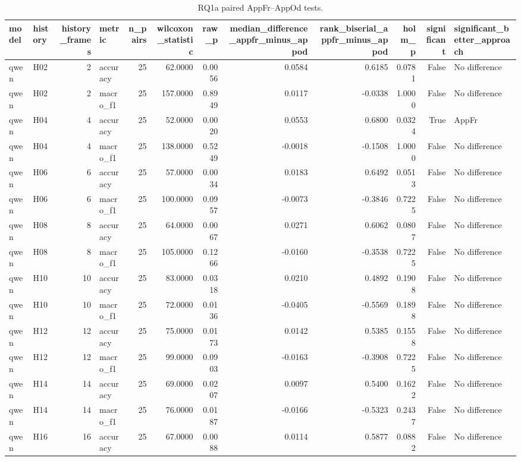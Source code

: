 \begin{table}[tbp]
\caption{RQ1a paired AppFr--AppOd tests.}
\label{tab:rq1a_appfr_vs_appod_wilcoxon}
\begin{tabular}{llrlrrrrrrrl}
\toprule
model & history & history\_frames & metric & n\_pairs & wilcoxon\_statistic & raw\_p & median\_difference\_appfr\_minus\_appod & rank\_biserial\_appfr\_minus\_appod & holm\_p & significant & significant\_better\_approach \\
\midrule
qwen & H02 & 2 & accuracy & 25 & 62.0000 & 0.0056 & 0.0584 & 0.6185 & 0.0781 & False & No difference \\
qwen & H02 & 2 & macro\_f1 & 25 & 157.0000 & 0.8949 & 0.0117 & -0.0338 & 1.0000 & False & No difference \\
qwen & H04 & 4 & accuracy & 25 & 52.0000 & 0.0020 & 0.0553 & 0.6800 & 0.0324 & True & AppFr \\
qwen & H04 & 4 & macro\_f1 & 25 & 138.0000 & 0.5249 & -0.0018 & -0.1508 & 1.0000 & False & No difference \\
qwen & H06 & 6 & accuracy & 25 & 57.0000 & 0.0034 & 0.0183 & 0.6492 & 0.0513 & False & No difference \\
qwen & H06 & 6 & macro\_f1 & 25 & 100.0000 & 0.0957 & -0.0073 & -0.3846 & 0.7225 & False & No difference \\
qwen & H08 & 8 & accuracy & 25 & 64.0000 & 0.0067 & 0.0271 & 0.6062 & 0.0807 & False & No difference \\
qwen & H08 & 8 & macro\_f1 & 25 & 105.0000 & 0.1266 & -0.0160 & -0.3538 & 0.7225 & False & No difference \\
qwen & H10 & 10 & accuracy & 25 & 83.0000 & 0.0318 & 0.0210 & 0.4892 & 0.1908 & False & No difference \\
qwen & H10 & 10 & macro\_f1 & 25 & 72.0000 & 0.0136 & -0.0405 & -0.5569 & 0.1898 & False & No difference \\
qwen & H12 & 12 & accuracy & 25 & 75.0000 & 0.0173 & 0.0142 & 0.5385 & 0.1558 & False & No difference \\
qwen & H12 & 12 & macro\_f1 & 25 & 99.0000 & 0.0903 & -0.0163 & -0.3908 & 0.7225 & False & No difference \\
qwen & H14 & 14 & accuracy & 25 & 69.0000 & 0.0207 & 0.0097 & 0.5400 & 0.1622 & False & No difference \\
qwen & H14 & 14 & macro\_f1 & 25 & 76.0000 & 0.0187 & -0.0166 & -0.5323 & 0.2437 & False & No difference \\
qwen & H16 & 16 & accuracy & 25 & 67.0000 & 0.0088 & 0.0114 & 0.5877 & 0.0882 & False & No difference \\

\end{tabular}
\end{table}

